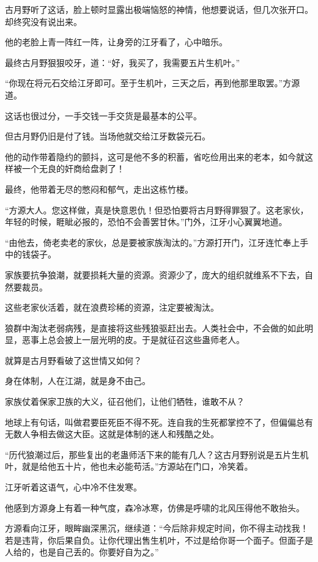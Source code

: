 \begin{this_body}
古月野听了这话，脸上顿时显露出极端恼怒的神情，他想要说话，但几次张开口。却终究没有说出来。

他的老脸上青一阵红一阵，让身旁的江牙看了，心中暗乐。

最终古月野狠狠咬牙，道：“好，我买了，我需要五片生机叶。”

“你现在将元石交给江牙即可。至于生机叶，三天之后，再到他那里取罢。”方源道。

这话也很过分，一手交钱一手交货是最基本的公平。

但古月野仍旧是付了钱。当场他就交给江牙数袋元石。

他的动作带着隐约的颤抖，这可是他不多的积蓄，省吃俭用出来的老本，如今就这样被一个无良的奸商给盘剥了！

最终，他带着无尽的憋闷和郁气，走出这栋竹楼。

“方源大人。您这样做，真是快意恩仇！但恐怕要将古月野得罪狠了。这老家伙，年轻的时候，睚眦必报的，恐怕不会善罢甘休。”门外，江牙小心翼翼地道。

“由他去，倚老卖老的家伙，总是要被家族淘汰的。”方源打开门，江牙连忙奉上手中的钱袋子。

家族要抗争狼潮，就要损耗大量的资源。资源少了，庞大的组织就维系不下去，自然要裁员。

这些老家伙活着，就在浪费珍稀的资源，注定要被淘汰。

狼群中淘汰老弱病残，是直接将这些残狼驱赶出去。人类社会中，不会做的如此明显，恶事上总会披上一层光明的皮。于是就征召这些蛊师老人。

就算是古月野看破了这世情又如何？

身在体制，人在江湖，就是身不由己。

家族仗着保家卫族的大义，征召他们，让他们牺牲，谁敢不从？

地球上有句话，叫做君要臣死臣不得不死。连自我的生死都掌控不了，但偏偏总有无数人争相去做这大臣。这就是体制的迷人和残酷之处。

“历代狼潮过后，那些复出的老蛊师活下来的能有几人？这古月野别说是五片生机叶，就是给他五十片，他也未必能苟活。”方源站在门口，冷笑着。

江牙听着这语气，心中冷不住发寒。

他感到方源身上有着一种气度，森冷冰寒，仿佛是呼啸的北风压得他不敢抬头。

方源看向江牙，眼眸幽深黑沉，继续道：“今后除非规定时间，你不得主动找我！若是违背，你后果自负。让你代理出售生机叶，不过是给你哥一个面子。但面子是人给的，也是自己丢的。你要好自为之。”


\end{this_body}
